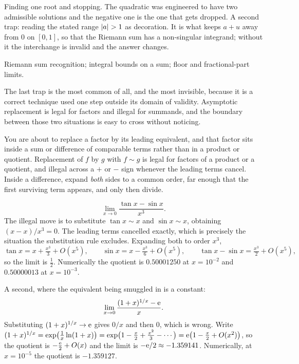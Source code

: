 \begin{trap}
Finding one root and stopping. The quadratic was engineered to have two admissible solutions and the negative one is the one that gets dropped. A second trap: reading the stated range $\left\lvert a\right\rvert>1$ as decoration. It is what keeps $a+u$ away from $0$ on $[0,1]$, so that the Riemann sum has a non-singular integrand; without it the interchange is invalid and the answer changes.
\end{trap}

\begin{seealsob}Riemann sum recognition; integral bounds on a sum; floor and fractional-part limits.\end{seealsob}

The last trap is the most common of all, and the most invisible, because it is a correct technique used one step outside its domain of validity. Asymptotic replacement is legal for factors and illegal for summands, and the boundary between those two situations is easy to cross without noticing.

\cue You are about to replace a factor by its leading equivalent, and that factor sits inside a sum or difference of comparable terms rather than in a product or quotient.
\method Replacement of $f$ by $g$ with $f\sim g$ is legal for factors of a product or a quotient, and illegal across a $+$ or $-$ sign whenever the leading terms cancel. Inside a difference, expand \emph{both} sides to a common order, far enough that the first surviving term appears, and only then divide.

\begin{worked}
\[\lim_{x\to0}\frac{\tan x-\sin x}{x^{3}} .\]
The illegal move is to substitute $\tan x\sim x$ and $\sin x\sim x$, obtaining $(x-x)/x^{3}=0$. The leading terms cancelled exactly, which is precisely the situation the substitution rule excludes. Expanding both to order $x^{3}$,
\[\tan x=x+\tfrac{x^{3}}{3}+O(x^{5}),\qquad \sin x=x-\tfrac{x^{3}}{6}+O(x^{5}),\qquad \tan x-\sin x=\tfrac{x^{3}}{2}+O(x^{5}),\]
so the limit is $\tfrac12$. Numerically the quotient is $0.50001250$ at $x=10^{-2}$ and $0.50000013$ at $x=10^{-3}$.

A second, where the equivalent being smuggled in is a constant:
\[\lim_{x\to0}\frac{(1+x)^{1/x}-\mathrm{e}}{x} .\]
Substituting $(1+x)^{1/x}\to\mathrm{e}$ gives $0/x$ and then $0$, which is wrong. Write $(1+x)^{1/x}=\exp\bigl(\tfrac1x\ln(1+x)\bigr)=\exp\bigl(1-\tfrac x2+\tfrac{x^{2}}{3}-\cdots\bigr)=\mathrm{e}\bigl(1-\tfrac x2+O(x^{2})\bigr)$, so the quotient is $-\tfrac{\mathrm{e}}{2}+O(x)$ and the limit is $-\mathrm{e}/2\approx-1.359141$. Numerically, at $x=10^{-5}$ the quotient is $-1.359127$.
\end{worked}

